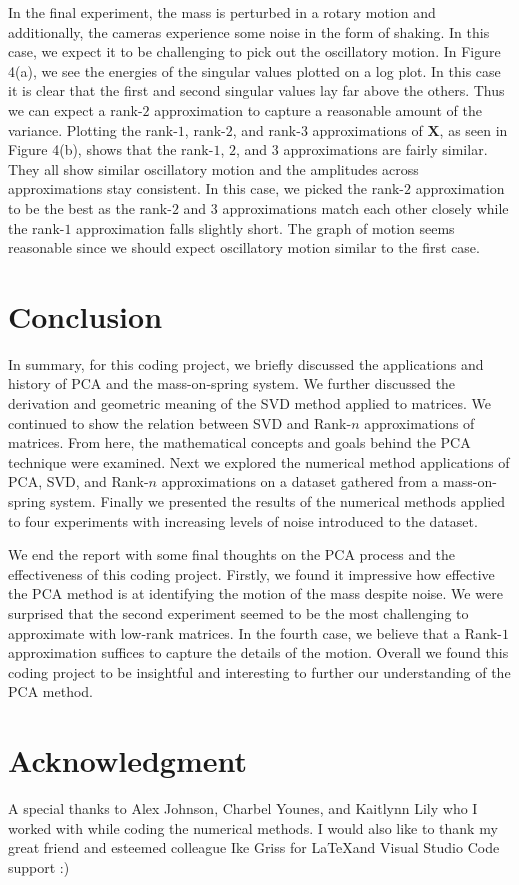 \documentclass[12pt]{article}%
\begin{document}
In the final experiment, the mass is perturbed in a rotary motion and additionally, the cameras experience some noise in the form of shaking. In this case, we expect it to be challenging to pick out the oscillatory motion. In Figure 4(a), we see the energies of the singular values plotted on a log plot. In this case it is clear that the first and second singular values lay far above the others. Thus we can expect a rank-$2$ approximation to capture a reasonable amount of the variance. Plotting the rank-$1$, rank-$2$, and rank-$3$ approximations of $\mathbf{X}$, as seen in Figure 4(b), shows that the rank-$1$, $2$, and $3$ approximations are fairly similar. They all show similar oscillatory motion and the amplitudes across approximations stay consistent. In this case, we picked the rank-$2$ approximation to be the best as the rank-$2$ and $3$ approximations match each other closely while the rank-$1$ approximation falls slightly short. The graph of motion seems reasonable since we should expect oscillatory motion similar to the first case.


\section{Conclusion}\label{Sec: Conclusion}

In summary, for this coding project, we briefly discussed the applications and history of PCA and the mass-on-spring system. We further discussed the derivation and geometric meaning of the SVD method applied to matrices. We continued to show the relation between SVD and Rank-$n$ approximations of matrices. From here, the mathematical concepts and goals behind the PCA technique were examined. Next we explored the numerical method applications of PCA, SVD, and Rank-$n$ approximations on a dataset gathered from a mass-on-spring system. Finally we presented the results of the numerical methods applied to four experiments with increasing levels of noise introduced to the dataset. 

We end the report with some final thoughts on the PCA process and the effectiveness of this coding project. Firstly, we found it impressive how effective the PCA method is at identifying the motion of the mass despite noise. We were surprised that the second experiment seemed to be the most challenging to approximate with low-rank matrices. In the fourth case, we believe that a Rank-$1$ approximation suffices to capture the details of the motion. Overall we found this coding project to be insightful and interesting to further our understanding of the PCA method. 


\section*{Acknowledgment}

A special thanks to Alex Johnson, Charbel Younes, and Kaitlynn Lily who I worked with while coding the numerical methods. I would also like to thank my great friend and esteemed colleague Ike Griss for \LaTeX  and Visual Studio Code support :)
\end{document}
